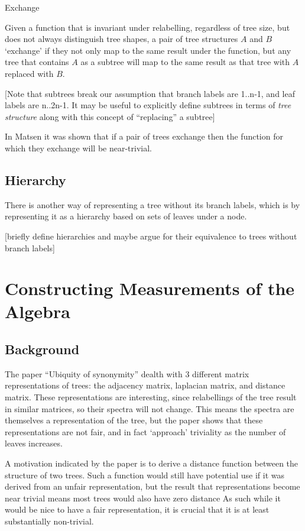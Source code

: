 \documentclass{article}
\begin{document}
\begin{definition} Exchange

	Given a function that is invariant under relabelling, regardless of tree
	size, but does not always distinguish tree shapes, a pair of tree
	structures $A$ and $B$ `exchange' if they not only map to the same result
	under the function, but any tree that contains $A$ as a subtree will map to
	the same result as that tree with $A$ replaced with $B$.
\end{definition}

[Note that subtrees break our assumption that branch labels are 1..n-1, and
leaf labels are n..2n-1. It may be useful to explicitly define subtrees in
terms of \emph{tree structure} along with this concept of ``replacing'' a
subtree]

In Matsen it was shown that if a pair of trees exchange then the function for
which they exchange will be near-trivial.

\subsection{Hierarchy}

There is another way of representing a tree without its branch labels, which is
by representing it as a hierarchy based on sets of leaves under a node.

[briefly define hierarchies and maybe argue for their equivalence to trees
without branch labels]

\section{Constructing Measurements of the Algebra}

\subsection{Background}

The paper ``Ubiquity of synonymity'' dealth with 3 different matrix
representations of trees: the adjacency matrix, laplacian matrix, and distance
matrix.
These representations are interesting, since relabellings of the tree result
in similar matrices, so their spectra will not change.
This means the spectra are themselves a representation of the tree, but the
paper shows that these representations are not fair, and in fact `approach'
triviality as the number of leaves increases.

A motivation indicated by the paper is to derive a distance function between
the structure of two trees.
Such a function would still have potential use if it was derived from an unfair
representation, but the result that representations become near trivial means
most trees would also have zero distance
As such while it would be nice to have a fair representation, it is crucial
that it is at least substantially non-trivial.
\end{document}
